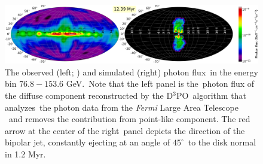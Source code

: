 \documentclass[fleqn,usenatbib,useAMS]{mnras}
\begin{document}
\begin{figure}
  \includegraphics[width=\linewidth]{figures/fig__GammaRay_100e9_1e6_angle_000.png}
  \caption{The observed (left; \citealt{Selig2015}) and simulated (right) photon flux\
           in the energy bin $76.8-153.6$ GeV.\
           Note that the left panel is the\
           photon flux of the diffuse component reconstructed by the D$^3$PO\
           algorithm \citep{Selig2015} that analyzes\
           the photon data from the \textit{Fermi} Large Area Telescope \citep{Atwood2009}\
           and removes the contribution from point-like component.
           The red arrow at the center of the right\
           panel depicts the direction of the bipolar jet, constantly ejecting at an angle of $45^{\circ}$\
           to the disk normal in 1.2 Myr.
  }
  \label{fig__gammaRay-map}
\end{figure}
\end{document}
